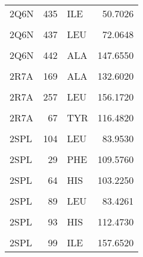 \begin{table}
\begin{tabular}{lrlr}
			2Q6N & 435 & ILE & 50.7026\\
			\addlinespace
			\cellcolor{gray!6}{2Q6N} & \cellcolor{gray!6}{436} & \cellcolor{gray!6}{CYS} & \cellcolor{gray!6}{109.8240}\\
			2Q6N & 437 & LEU & 72.0648\\
			\cellcolor{gray!6}{2Q6N} & \cellcolor{gray!6}{439} & \cellcolor{gray!6}{GLU} & \cellcolor{gray!6}{58.8909}\\
			2Q6N & 442 & ALA & 147.6550\\
			\cellcolor{gray!6}{2R7A} & \cellcolor{gray!6}{167} & \cellcolor{gray!6}{LEU} & \cellcolor{gray!6}{132.6910}\\
			\addlinespace
			2R7A & 169 & ALA & 132.6020\\
			\cellcolor{gray!6}{2R7A} & \cellcolor{gray!6}{253} & \cellcolor{gray!6}{GLN} & \cellcolor{gray!6}{123.5700}\\
			2R7A & 257 & LEU & 156.1720\\
			\cellcolor{gray!6}{2R7A} & \cellcolor{gray!6}{52} & \cellcolor{gray!6}{THR} & \cellcolor{gray!6}{116.2990}\\
			2R7A & 67 & TYR & 116.4820\\
			\addlinespace
			\cellcolor{gray!6}{2R7A} & \cellcolor{gray!6}{68} & \cellcolor{gray!6}{TRP} & \cellcolor{gray!6}{91.3335}\\
			2SPL & 104 & LEU & 83.9530\\
			\cellcolor{gray!6}{2SPL} & \cellcolor{gray!6}{107} & \cellcolor{gray!6}{ILE} & \cellcolor{gray!6}{170.3470}\\
			2SPL & 29 & PHE & 109.5760\\
			\cellcolor{gray!6}{2SPL} & \cellcolor{gray!6}{43} & \cellcolor{gray!6}{PHE} & \cellcolor{gray!6}{96.0910}\\
			\addlinespace
			2SPL & 64 & HIS & 103.2250\\
			\cellcolor{gray!6}{2SPL} & \cellcolor{gray!6}{68} & \cellcolor{gray!6}{VAL} & \cellcolor{gray!6}{111.2660}\\
			2SPL & 89 & LEU & 83.4261\\
			\cellcolor{gray!6}{2SPL} & \cellcolor{gray!6}{92} & \cellcolor{gray!6}{SER} & \cellcolor{gray!6}{113.0460}\\
			2SPL & 93 & HIS & 112.4730\\
			\addlinespace
			\cellcolor{gray!6}{2SPL} & \cellcolor{gray!6}{97} & \cellcolor{gray!6}{HIS} & \cellcolor{gray!6}{176.0860}\\
			2SPL & 99 & ILE & 157.6520\\

\end{tabular}
\end{table}

